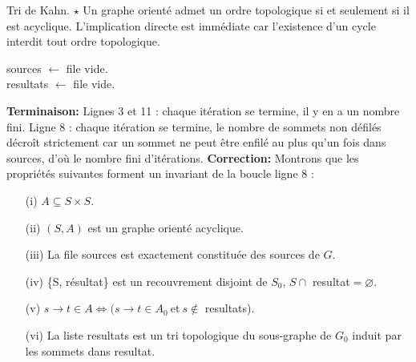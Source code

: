 \documentclass[french, 11pt]{article}
\begin{document}
\pagebreak

\begin{prop}{Tri de Kahn. $\star$}{}
    Un graphe orienté admet un ordre topologique si et seulement si il est acyclique.
    \tcblower
    L'implication directe est immédiate car l'existence d'un cycle interdit tout ordre topologique.\\
    \begin{algorithm}[H]
        \LinesNumbered
        \caption{Tri topologique de Kahn}
        sources $\gets$ file vide.\\
        resultats $\gets$ file vide.\\
    \end{algorithm}
    \textbf{Terminaison:} Lignes 3 et 11 : chaque itération se termine, il y en a un nombre fini.
    Ligne 8 : chaque itération se termine, le nombre de sommets non défilés décroît strictement car un sommet ne peut être enfilé au plus qu'un fois dans sources, d'où le nombre fini d'itérations.\n
    \textbf{Correction:} Montrons que les propriétés suivantes forment un invariant de la boucle ligne 8 :
    \begin{itemize}[topsep=0pt,itemsep=-0.9 ex]
        \item[(i)] $A \subseteq S\times S$.
        \item[(ii)] $(S,A)$ est un graphe orienté acyclique.
        \item[(iii)] La file sources est exactement constituée des sources de $G$.
        \item[(iv)] \{S, résultat\} est un recouvrement disjoint de $S_0$, $S\cap$ resultat$=\varnothing$.
        \item[(v)] $s\to t\in A \iff (s\to t \in A_0 ~$et$~ s\notin$ resultats).
        \item[(vi)] La liste resultats est un tri topologique du sous-graphe de $G_0$ induit par les sommets dans resultat. 

\end{itemize}
\end{prop}
\end{document}
